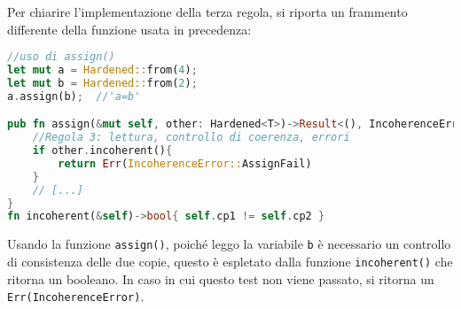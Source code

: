 \noindent
\begin{center}
\end{center}
Per chiarire l'implementazione della terza regola, si riporta un frammento differente della funzione usata in precedenza: 

\begin{lstlisting}[language=rust, style=boxed]
//uso di assign()
let mut a = Hardened::from(4); 
let mut b = Hardened::from(2); 
a.assign(b);  //'a=b'

pub fn assign(&mut self, other: Hardened<T>)->Result<(), IncoherenceError>{
    //Regola 3: lettura, controllo di coerenza, errori
    if other.incoherent(){
        return Err(IncoherenceError::AssignFail)
    }
    // [...]
}
fn incoherent(&self)->bool{ self.cp1 != self.cp2 }
\end{lstlisting}
Usando la funzione \texttt{assign()}, poiché leggo la variabile \texttt{b} è necessario un controllo di consistenza delle due copie, questo è espletato dalla funzione \texttt{incoherent()} che ritorna un booleano. In caso in cui questo test non viene passato, si ritorna un \texttt{Err(IncoherenceError)}.

